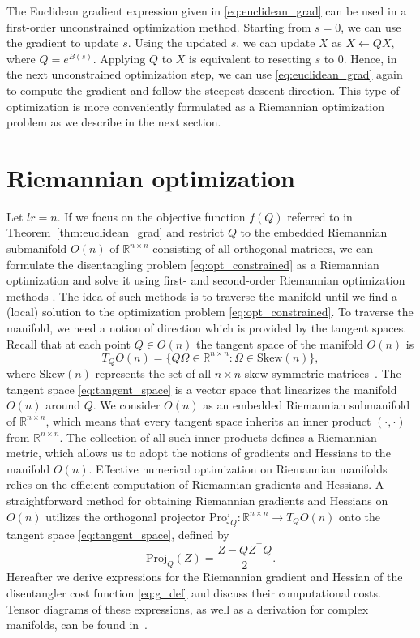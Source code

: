 \documentclass[pdflatex,sn-mathphys-num]{sn-jnl}
\newcounter{thm}[section]
\begin{document}
The Euclidean gradient expression given in \eqref{eq:euclidean_grad} can be used in a first-order unconstrained optimization method. Starting from $s=0$, we can use the gradient to update $s$. Using the updated $s$, we can update $X$ as $X \leftarrow QX$, where $Q=e^{B(s)}$. Applying $Q$ to $X$ is equivalent to resetting $s$ to 0. Hence, in the next unconstrained optimization step, we can use \eqref{eq:euclidean_grad} again to compute the gradient and follow the steepest descent direction. This type of optimization is more conveniently formulated as a Riemannian optimization problem as we describe in the next section.

\section{Riemannian optimization}
\label{sec:riemannian}
Let $lr = n$. If we focus on the objective function $f(Q)$ referred to in Theorem~\ref{thm:euclidean_grad} and restrict $Q$ to the embedded Riemannian submanifold $O(n)$ of $\mathbb{R}^{n \times n}$ consisting of all orthogonal matrices, we can formulate the disentangling problem \eqref{eq:opt_constrained} as a Riemannian optimization and solve it using first- and second-order Riemannian optimization methods \cite{Absil2009,boumal2023introduction}. The idea of such methods is to traverse the manifold until we find a (local) solution to the optimization problem \eqref{eq:opt_constrained}. To traverse the manifold, we need a notion of direction which is provided by the tangent spaces. Recall that at each point $Q \in O(n)$ the tangent space of the manifold $O(n)$ is 
\begin{equation} \label{eq:tangent_space}
T_Q O(n) = \{ Q\Omega \in \mathbb{R}^{n\times n}: \Omega \in \textrm{Skew}(n)\},
\end{equation}
where $\textrm{Skew}(n)$ represents the set of all $n\times n$ skew symmetric matrices~\cite{boumal2023introduction}. The tangent space \eqref{eq:tangent_space} is a vector space that linearizes the manifold $O(n)$ around $Q$. We consider $O(n)$ as an embedded Riemannian submanifold of $\mathbb{R}^{n \times n}$, which means that every tangent space inherits an inner product $(\cdot,\cdot)$ from $\mathbb{R}^{n \times n}$. The collection of all such inner products defines a Riemannian metric, which allows us to adopt the notions of gradients and Hessians to the manifold $O(n)$. Effective numerical optimization on Riemannian manifolds relies on the efficient computation of Riemannian gradients and Hessians. A straightforward method for obtaining Riemannian gradients and Hessians on $O(n)$ utilizes the orthogonal projector $\textrm{Proj}_Q:\mathbb{R}^{n\times n} \to T_Q O(n)$ onto the tangent space \eqref{eq:tangent_space}, defined by 
\begin{equation}
\textrm{Proj}_Q(Z) =\frac{Z - Q Z^{\top} Q}{2}.
\label{eq:orthoproj}
\end{equation}
Hereafter we derive expressions for the Riemannian gradient and Hessian of the disentangler cost function \eqref{eq:g_def} and discuss their computational costs. Tensor diagrams of these expressions, as well as a derivation for complex manifolds, can be found in~\cite{sappler2024}.
\end{document}
